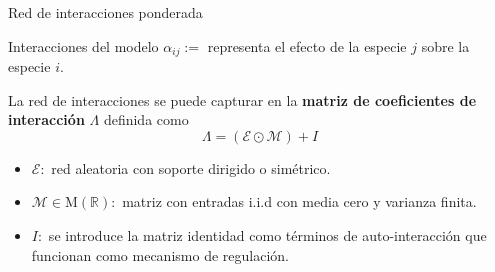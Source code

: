 \documentclass[10pt,aspectratio=169]{beamer}
\theoremstyle{plain}
\theoremstyle{definition}
\begin{document}
\begin{frame}{Red de interacciones ponderada}
	\begin{block}{Interacciones del modelo}
		$\alpha_{ij}:=$ representa el efecto de la especie $j$ sobre la especie $i$.
	\end{block}
	La red de interacciones se puede capturar en la \textbf{matriz de coeficientes de interacción} $\Lambda$ definida como
	$$\Lambda=(\mathcal{E}\odot\mathcal{M})+I$$
	\begin{itemize}
		\item $\mathcal{E}:$ red aleatoria con soporte dirigido o simétrico.
		\item $\mathcal{M}\in\mathrm{M}(\mathbb{R}):$ matriz con entradas i.i.d con media cero y varianza finita.
		\item $I:$ se introduce la matriz identidad como términos de auto-interacción que funcionan como mecanismo de regulación.
	\end{itemize}
\end{frame}
\end{document}
